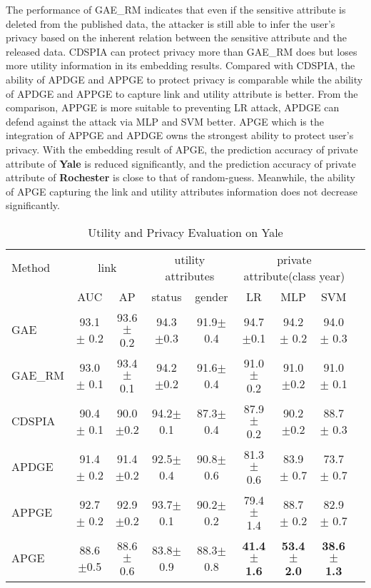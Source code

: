 \documentclass{article}
\begin{document}
The performance of GAE\_RM indicates that even if the sensitive attribute is deleted from the published data, the attacker is still able to infer the user's privacy based on the inherent relation between the sensitive attribute and the released data.
CDSPIA can protect privacy more than GAE\_RM does but loses more utility information in its embedding results.
Compared with CDSPIA, the ability of APDGE and APPGE to protect privacy is comparable while the ability of APDGE and APPGE to capture link and utility attribute is better.
From the comparison, APPGE is more suitable to preventing LR attack, APDGE can defend against the attack via MLP and SVM better.  APGE which is the integration of APPGE and APDGE owns the strongest ability to protect user's privacy.  With the embedding result of APGE, the prediction accuracy of private attribute of {\bf Yale} is reduced significantly, and the prediction accuracy of private attribute of {\bf Rochester} is close to that of random-guess. Meanwhile, the ability of APGE capturing the link and utility attributes information does not decrease significantly.
%
\begin{table}
\small
  \caption{Utility and Privacy Evaluation on Yale}
  \label{Tab:Yale}
  \centering
  \begin{tabular}{lcccccccc}
    \toprule
     Method & \multicolumn{2}{c}{link} & \multicolumn{2}{c}{utility attributes} &\multicolumn{3}{c}{private attribute(class year)}                  \\
    \cmidrule(r){2-3} \cmidrule(r){4-5} \cmidrule(r){6-8}
       & AUC  &AP     &status &gender  &LR  &MLP &SVM  \\
    \midrule
    GAE & 93.1 $\pm$ 0.2 &93.6$\pm$ 0.2     &94.3 $\pm$0.3  &91.9$\pm$ 0.4  &94.7 $\pm$0.1 &94.2$\pm$  0.2 &94.0$\pm$ 0.3\\
    GAE\_RM    &93.0 $\pm$ 0.1 &93.4$\pm$ 0.1  &94.2 $\pm$0.2   &91.6$\pm$ 0.4  &91.0$\pm$ 0.2 &91.0 $\pm$0.2 &91.0$\pm$ 0.1   \\
    CDSPIA     &90.4 $\pm$  0.1    &90.0 $\pm$0.2  &94.2$\pm$ 0.1  &87.3$\pm$ 0.4 &87.9$\pm$ 0.2 &90.2 $\pm$0.2 &88.7$\pm$ 0.3 \\
    APDGE     &91.4 $\pm$  0.2     & 91.4 $\pm$0.2  &92.5$\pm$ 0.4  &90.8$\pm$ 0.6 &81.3$\pm$ 0.6  &83.9$\pm$ 0.7 &73.7$\pm$ 0.7 \\
    APPGE    &92.7 $\pm$  0.2   &92.9 $\pm$0.2  &93.7$\pm$ 0.1  &90.2$\pm$ 0.2 &79.4$\pm$ 1.4 &88.7$\pm$ 0.2 &82.9$\pm$ 0.7\\
    APGE     &88.6   $\pm $0.5  &88.6$\pm$ 0.6  &83.8$\pm$ 0.9  &88.3$\pm$ 0.8 &\textbf{41.4$\pm$ 1.6} &\textbf{53.4$\pm$ 2.0} &\textbf{38.6$\pm$ 1.3}\\
    \bottomrule
  \end{tabular}
\end{table}
\end{document}
